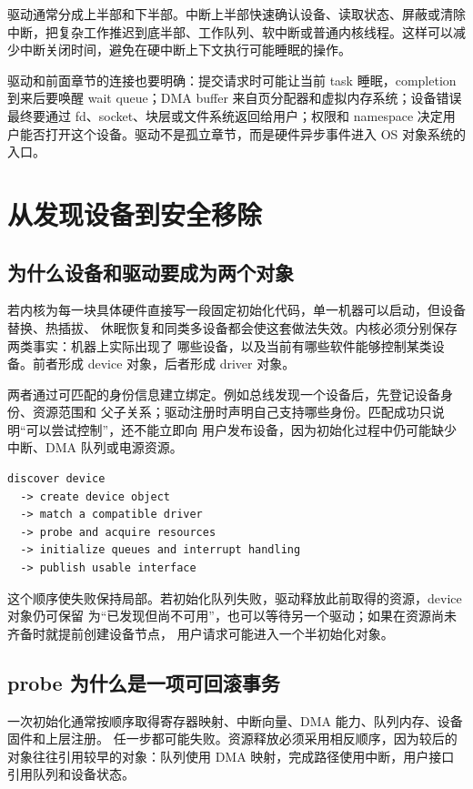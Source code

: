 驱动通常分成上半部和下半部。中断上半部快速确认设备、读取状态、屏蔽或清除中断，把复杂工作推迟到底半部、工作队列、软中断或普通内核线程。这样可以减少中断关闭时间，避免在硬中断上下文执行可能睡眠的操作。

驱动和前面章节的连接也要明确：提交请求时可能让当前 task 睡眠，completion 到来后要唤醒 wait queue；DMA buffer 来自页分配器和虚拟内存系统；设备错误最终要通过 fd、socket、块层或文件系统返回给用户；权限和 namespace 决定用户能否打开这个设备。驱动不是孤立章节，而是硬件异步事件进入 OS 对象系统的入口。

\section{从发现设备到安全移除}

\subsection{为什么设备和驱动要成为两个对象}

若内核为每一块具体硬件直接写一段固定初始化代码，单一机器可以启动，但设备替换、热插拔、
休眠恢复和同类多设备都会使这套做法失效。内核必须分别保存两类事实：机器上实际出现了
哪些设备，以及当前有哪些软件能够控制某类设备。前者形成 device 对象，后者形成 driver 对象。

两者通过可匹配的身份信息建立绑定。例如总线发现一个设备后，先登记设备身份、资源范围和
父子关系；驱动注册时声明自己支持哪些身份。匹配成功只说明“可以尝试控制”，还不能立即向
用户发布设备，因为初始化过程中仍可能缺少中断、DMA 队列或电源资源。

\begin{lstlisting}
discover device
  -> create device object
  -> match a compatible driver
  -> probe and acquire resources
  -> initialize queues and interrupt handling
  -> publish usable interface
\end{lstlisting}

这个顺序使失败保持局部。若初始化队列失败，驱动释放此前取得的资源，device 对象仍可保留
为“已发现但尚不可用”，也可以等待另一个驱动；如果在资源尚未齐备时就提前创建设备节点，
用户请求可能进入一个半初始化对象。

\subsection{probe 为什么是一项可回滚事务}

一次初始化通常按顺序取得寄存器映射、中断向量、DMA 能力、队列内存、设备固件和上层注册。
任一步都可能失败。资源释放必须采用相反顺序，因为较后的对象往往引用较早的对象：队列使用
DMA 映射，完成路径使用中断，用户接口引用队列和设备状态。

